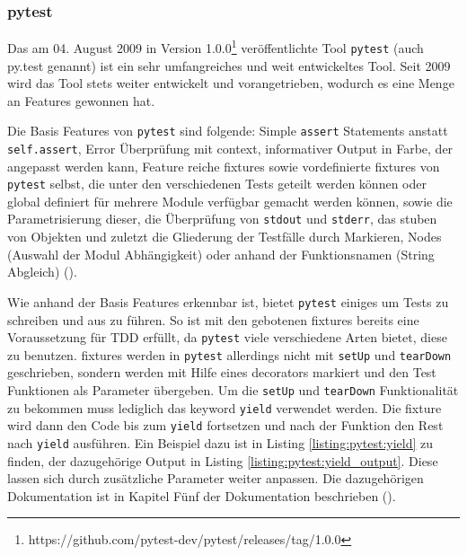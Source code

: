 \subsubsection{pytest}\label{python-tools:pytest}
Das am 04. August 2009 in Version
1.0.0\footnote{https://github.com/pytest-dev/pytest/releases/tag/1.0.0}
veröffentlichte Tool \lstinline{pytest} (auch py.test genannt)
ist ein sehr umfangreiches und weit entwickeltes Tool. Seit 2009 wird das Tool
stets weiter entwickelt und vorangetrieben, wodurch es eine Menge an Features
gewonnen hat.
\newline

Die Basis Features von \lstinline{pytest} sind folgende:
Simple \lstinline{assert} Statements anstatt \lstinline{self.assert}, Error
Überprüfung mit \Gls{context}, informativer Output in Farbe, der angepasst
werden kann, Feature reiche \Glspl{fixture} sowie vordefinierte \Glspl{fixture}
von \lstinline{pytest} selbst, die unter den verschiedenen Tests geteilt werden
können oder global definiert für mehrere Module verfügbar gemacht werden
können, sowie die Parametrisierung dieser, die Überprüfung von
\lstinline{stdout} und \lstinline{stderr}, das \gls{stub}en von Objekten und
zuletzt die Gliederung der Testfälle durch Markieren, Nodes (Auswahl der Modul
Abhängigkeit) oder anhand der Funktionsnamen (String Abgleich)
(\cite{docs.pytest.org:4.4}).

Wie anhand der Basis Features erkennbar ist, bietet \lstinline{pytest} einiges
um Tests zu schreiben und aus zu führen. So ist mit den gebotenen
\Glspl{fixture} bereits eine Voraussetzung für TDD erfüllt, da
\lstinline{pytest} viele verschiedene Arten bietet, diese zu benutzen.
\Glspl{fixture} werden in \lstinline{pytest} allerdings nicht mit
\lstinline{setUp} und \lstinline{tearDown} geschrieben, sondern werden mit Hilfe
eines \glspl{decorator} markiert und den Test Funktionen als Parameter
übergeben. Um die \lstinline{setUp} und \lstinline{tearDown} Funktionalität zu
bekommen muss lediglich das keyword \lstinline{yield} verwendet werden. Die
\Gls{fixture} wird dann den Code bis zum \lstinline{yield} fortsetzen und nach
der Funktion den Rest nach \lstinline{yield} ausführen. Ein Beispiel dazu ist in
Listing \ref{listing:pytest:yield} zu finden, der dazugehörige Output in
Listing \ref{listing:pytest:yield_output}. Diese lassen sich durch zusätzliche
Parameter weiter anpassen. Die dazugehörigen Dokumentation ist in Kapitel Fünf
der Dokumentation beschrieben (\cite{docs.pytest.org:4.4}).


